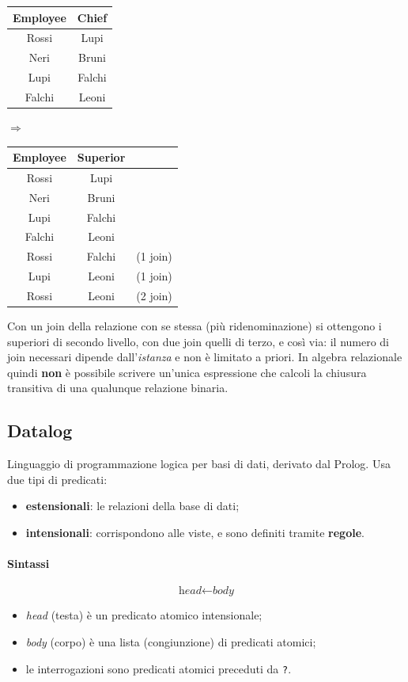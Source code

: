 \documentclass[a4paper,12pt]{article}
\begin{document}
\begin{center}
\begin{tabular}{cc}
\hline Employee & Chief\\ \hline
Rossi & Lupi\\ Neri & Bruni\\ Lupi & Falchi\\ Falchi & Leoni\\ \hline
\end{tabular}
\qquad$\Rightarrow$\qquad
\begin{tabular}{ccl}
\hline Employee & Superior & \\ \hline
Rossi & Lupi & \\ Neri & Bruni & \\ Lupi & Falchi & \\ Falchi & Leoni & \\
Rossi & Falchi & (1 join)\\ Lupi & Leoni & (1 join)\\
Rossi & Leoni & (2 join)\\ \hline
\end{tabular}
\end{center}

Con un join della relazione con se stessa (più ridenominazione) si ottengono i
superiori di secondo livello, con due join quelli di terzo, e così via: il
numero di join necessari dipende dall'\emph{istanza} e non è limitato a priori.
In algebra relazionale quindi \textbf{non} è possibile scrivere un'unica
espressione che calcoli la chiusura transitiva di una qualunque relazione
binaria.

\subsection{Datalog}

Linguaggio di programmazione logica per basi di dati, derivato dal Prolog. Usa
due tipi di predicati:
\begin{itemize}
  \item \textbf{estensionali}: le relazioni della base di dati;
  \item \textbf{intensionali}: corrispondono alle viste, e sono definiti
    tramite \textbf{regole}.
\end{itemize}

\paragraph{Sintassi}
\[
  \textit{head} \leftarrow \textit{body}
\]
\begin{itemize}
  \item \emph{head} (testa) è un predicato atomico intensionale;
  \item \emph{body} (corpo) è una lista (congiunzione) di predicati atomici;
  \item le interrogazioni sono predicati atomici preceduti da \texttt{?}.
\end{itemize}
\end{document}
